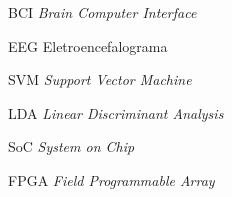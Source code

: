 \begin{siglas}
  \item[BCI] \textit{Brain Computer Interface}
  \item[EEG] Eletroencefalograma
  \item[SVM] \textit{Support Vector Machine}
  \item[LDA] \textit{Linear Discriminant Analysis}
  \item[SoC] \textit{System on Chip}
  \item[FPGA] \textit{Field Programmable Array}
  
\end{siglas}
